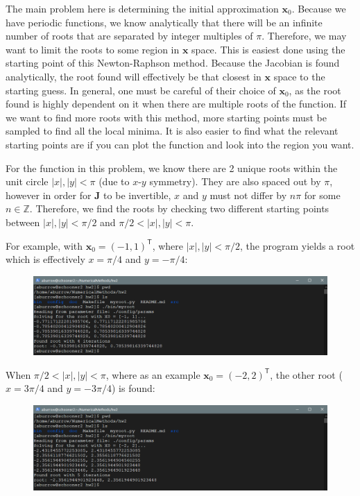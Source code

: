\documentclass[12pt]{article}
\begin{document}
The main problem here is determining the initial approximation
$\boldsymbol{x}_0$. Because we have periodic functions, we know analytically
that there will be an infinite number of roots that are separated by integer
multiples of $\pi$. Therefore, we may want to limit the roots to some region in
$\boldsymbol{x}$ space. This is easiest done using the starting point of this
Newton-Raphson method. Because the Jacobian is found analytically, the root
found will effectively be that closest in $\boldsymbol{x}$ space to the
starting guess. In general, one must be careful of their choice of
$\boldsymbol{x}_0$, as the root found is highly dependent on it when there are
multiple roots of the function. If we want to find more roots with this method,
more starting points must be sampled to find all the local minima. It is also
easier to find what the relevant starting points are if you can plot the
function and look into the region you want.

For the function in this problem, we know there are 2 unique roots within the
unit circle $|x|, |y| < \pi$ (due to $x$-$y$ symmetry). They are also
spaced out by $\pi$, however in order for $\boldsymbol{J}$ to be invertible,
$x$ and $y$ must not differ by $n\pi$ for some $n \in \mathbb{Z}$. Therefore,
we find the roots by checking two different starting points between $|x|, |y| <
\pi / 2$ and $\pi / 2 < |x|, |y| < \pi$.

For example, with $\boldsymbol{x}_0 = (-1, 1)^\mathsf{T}$, where $|x|, |y| <
\pi / 2$, the program yields a root which is effectively $x=\pi/4$ and
$y=-\pi/4$:
\begin{figure}[H]
    \centering
    \includegraphics[width=1.0\textwidth]{root1}
    \label{fig:root1}
\end{figure}
When $\pi / 2 < |x|, |y| < \pi$, where as an example $\boldsymbol{x}_0 =
(-2, 2)^\mathsf{T}$, the other root ($x=3\pi/4$ and $y=-3\pi/4$) is
found:
\begin{figure}[H]
    \centering
    \includegraphics[width=1.0\textwidth]{root2}
    \label{fig:root2}
\end{figure}
\end{document}
